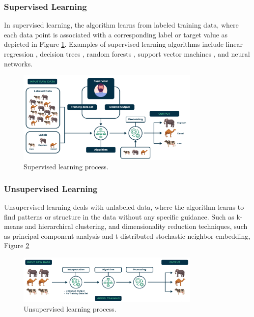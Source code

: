 \subsubsection{Supervised Learning}
In supervised learning, the algorithm learns from labeled training data, where each data point is associated with a corresponding label or target value as depicted in Figure \ref{fig:superml}. Examples of supervised learning algorithms include linear regression , decision trees , random forests , support vector machines , and neural networks.

\begin{figure}[H]
  \centering
  \includegraphics[width=0.8\textwidth]{Images/Chapter1/superml.png}
  \caption{Supervised learning process.}
  \label{fig:superml}
\end{figure}

\subsubsection{Unsupervised Learning}
Unsupervised learning deals with unlabeled data, where the algorithm learns to find patterns or
structure in the data without any specific guidance. Such as k-means and hierarchical
clustering, and dimensionality reduction techniques, such as principal component analysis
and t-distributed stochastic neighbor embedding,  Figure \ref{fig:unsuperml}
\begin{figure}[H]
  \centering
  \includegraphics[width=0.8\textwidth]{Images/Chapter1/unsuperml.png}
  \caption{Unsupervised learning process.}
  \label{fig:unsuperml}
\end{figure}

